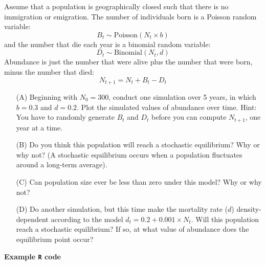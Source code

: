 \documentclass[12pt]{article}\usepackage[]{graphicx}\usepackage[]{xcolor}
\begin{document}
Assume that a population is geographically closed such that there is
no immigration or emigration. The number of individuals born is a
Poisson random variable:
\[
  B_t \sim \mathrm{Poisson}(N_t \times b)
\]
and the number that die each year is a binomial random variable:
\[
  D_t \sim \mathrm{Binomial}(N_t, d)
\]
Abundance is just the number that were alive plus the number that were
born, minus the number that died:
\[
  N_{t+1} = N_t + B_t - D_t
\]
\begin{enumerate}
  \item[(A)] Beginning with $N_0=300$, conduct one simulation over 5
    years, in which $b=0.3$ and $d=0.2$. Plot the simulated values of
    abundance over time. Hint: You have  to randomly generate $B_t$
    and $D_t$ before you can compute  $N_{t+1}$, one year at a time.
  \item[(B)] Do you think this population will reach a stochastic
    equilibrium? Why or why not? (A stochastic equilibrium occurs when
    a population fluctuates around a long-term average).
  \item[(C)] Can population size ever be less than zero under this model?
    Why or why not?
  \item[(D)] Do another simulation, but this time make the mortality rate
    ($d$) density-dependent according to the model $d_t = 0.2 +
    0.001\times N_t$. Will this population reach a stochastic equilibrium? If
    so, at what value of abundance does the equilibrium point occur?
\end{enumerate}


\newpage

{\bf Example {\tt R} code \\}


\end{document}
